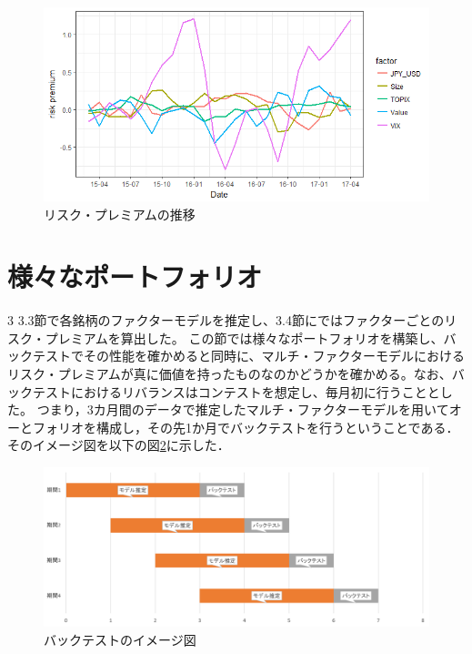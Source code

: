 \documentclass[11pt]{jreport}
\begin{document}
\begin{figure}[H]
	\begin{center}
		\includegraphics[width=15cm]{./fig/riskpremium.png}
		\caption{リスク・プレミアムの推移}
		\label{fig:riskpremium}
	\end{center}
\end{figure}
\section{様々なポートフォリオ}
3
3.3節で各銘柄のファクターモデルを推定し、3.4節にではファクターごとのリスク・プレミアムを算出した。
この節では様々なポートフォリオを構築し、バックテストでその性能を確かめると同時に、マルチ・ファクターモデルにおけるリスク・プレミアムが真に価値を持ったものなのかどうかを確かめる。なお、バックテストにおけるリバランスはコンテストを想定し、毎月初に行うこととした。
つまり，3カ月間のデータで推定したマルチ・ファクターモデルを用いてオーとフォリオを構成し，その先1か月でバックテストを行うということである．
そのイメージ図を以下の図\ref{fig:backtest}に示した．

\begin{figure}[H]
	\begin{center}
		\includegraphics[width=15cm]{./fig/backtest.png}
		\caption{バックテストのイメージ図}
		\label{fig:backtest}
	\end{center}
\end{figure}
\end{document}
